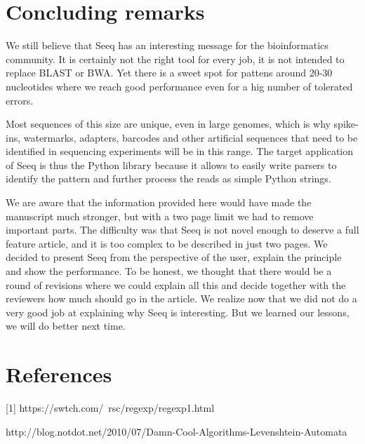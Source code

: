 \documentclass[12pt]{article}
\begin{document}
\section{Concluding remarks}

We still believe that Seeq has an interesting message for the
bioinformatics community. It is certainly not the right tool for
every job, it is not intended to replace BLAST or BWA. Yet there
is a sweet spot for pattens around 20-30 nucleotides where we
reach good performance even for a hig number of tolerated errors.

Most sequences of this size are unique, even in large genomes,
which is why spike-ins, watermarks, adapters, barcodes and
other artificial sequences that need to be identified in sequencing
experiments will be in this range. The target application of 
Seeq is thus the Python library because it allows to easily write
parsers to identify the pattern and further process the reads as
simple Python strings.

We are aware that the information provided here would have made
the manuscript much stronger, but with a two page limit we had to
remove important parts. The difficulty was that Seeq is not novel
enough to deserve a full feature article, and it is too complex
to be described in just two pages.
We decided to present Seeq from the
perspective of the user, explain the principle and show the
performance. To be honest, we thought that there would be a
round of revisions where we could explain all this and decide
together with the reviewers how much should go in the article.
We realize now that we did not do a very good job at explaining
why Seeq is interesting. But we learned our lessons, we will do
better next time.

\section{References}

[1] https://swtch.com/~rsc/regexp/regexp1.html
\par\noindent
[2] http://blog.notdot.net/2010/07/Damn-Cool-Algorithms-Levenshtein-Automata
\end{document}
